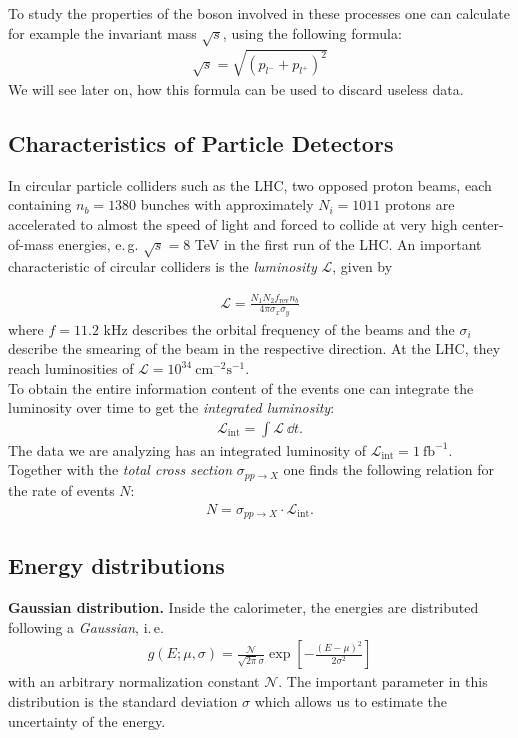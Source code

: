 \documentclass[twocolumn,
			   showpacs,%
               nofootinbib,
               aps,%
               prd,
               notitlepage,
               showkeys,
               10pt]{revtex4-1}
\begin{document}
To study the properties of the boson involved in these processes one can calculate for example the invariant mass $\sqrt{s}$, using the following formula:
\begin{align}
	\sqrt{s} = \sqrt{\left(p_{l^{-}} + p_{l^{+}}\right)^2}
\end{align}
We will see later on, how this formula can be used to discard useless data.
\subsection{Characteristics of Particle Detectors}
In circular particle colliders such as the LHC, two opposed proton beams, each containing $n_b = 1380$ bunches with approximately $N_i = 1011$ protons are accelerated to almost the speed of light and forced to collide at very high center-of-mass energies, e.\,g. $\sqrt{s} = 8$ TeV in the first run of the LHC. An important characteristic of circular colliders is the \textit{luminosity} $\mathcal{L}$, given by

\begin{align}
\mathcal{L} = \frac{N_1N_2f_{\text{rev}}n_b}{4\pi\sigma_x\sigma_y}
\end{align}
where $f = 11.2$ kHz describes the orbital frequency of the beams and the $\sigma_i$ describe the smearing of the beam in the respective direction. At the LHC, they reach luminosities of $\mathcal{L}=10^{34} \ \mathrm{cm}^{-2} \mathrm{s}^{-1}$.\\
To obtain the entire information content of the events one can integrate the luminosity over time to get the \textit{integrated luminosity}:
\begin{align}
\mathcal{L}_{\text{int}} = \int \mathcal{L} \ \dd t.
\end{align}
The data we are analyzing has an integrated luminosity of $\mathcal{L}_{\mathrm{int}}=1 \ \mathrm{fb}^{-1}$.\\
Together with the \textit{total cross section} $\sigma_{pp\rightarrow X}$ one finds the following relation for the rate of events $N$: 
\begin{align}
N = \sigma_{pp\rightarrow X} \cdot \mathcal{L}_{\text{int}}.
\end{align}

\subsection{Energy distributions}
\textbf{Gaussian distribution.} Inside the calorimeter, the energies are distributed following a \textit{Gaussian}, i.\,e. 
\begin{align}
g(E ; \mu, \sigma)=\frac{\mathcal{N}}{\sqrt{2 \pi} \sigma} \exp \left[-\frac{(E-\mu)^{2}}{2 \sigma^{2}}\right]
\label{eqn:Gaussian}
\end{align}
with an arbitrary normalization constant $\mathcal{N}$. The important parameter in this distribution is the standard deviation $\sigma$ which allows us to estimate the uncertainty of the energy.\\
\end{document}
